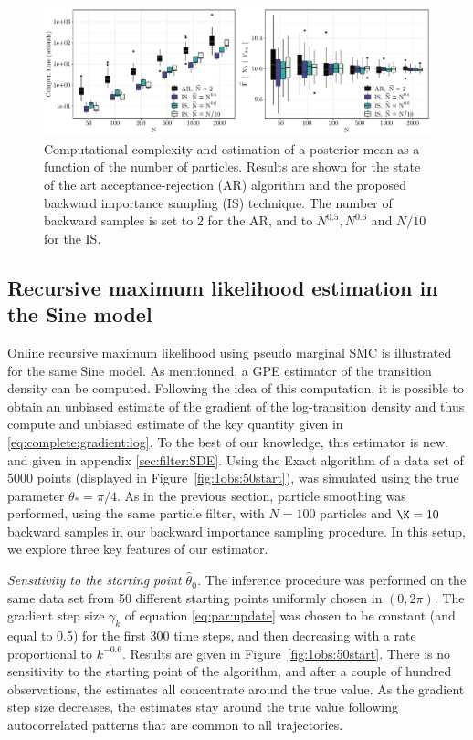 \documentclass[12pt]{article}
\newcommand{\parvec}{\theta}
\newcommand{\N}{N}
\begin{document}
\begin{figure}[h]
\begin{center}
\includegraphics[width = \textwidth]{Figure3.pdf}
\end{center}
\caption{Computational complexity and estimation of a posterior mean as a function of the number of particles. Results are shown for the state of the art acceptance-rejection (AR) algorithm and the proposed backward  importance sampling (IS) technique. The number of backward samples is set to 2 for the AR, and to $N^{0.5}, N^{0.6}$ and $N/10$ for the IS.}
\label{fig:sine:timeandbias:N:vary}
\end{figure}


\subsection{Recursive maximum likelihood estimation in the  Sine model}
\label{sec:simu:tangent:filter}
Online recursive maximum likelihood using pseudo marginal SMC is illustrated for the same Sine model.
As mentionned, a GPE estimator of the transition density can be computed. 
Following the idea of this computation, it is possible to obtain an unbiased estimate of the gradient of the log-transition density and thus compute and unbiased estimate of the key quantity given in \eqref{eq:complete:gradient:log}. 
To the best of our knowledge, this estimator is new, and given in appendix \ref{sec:filter:SDE}.
Using the Exact algorithm of \cite{beskos2006retrospective} a data set of 5000 points (displayed in Figure~\ref{fig:1obs:50start}), was simulated using the true parameter $\parvec_* = \pi/4$. 
As in the previous section, particle smoothing was performed, using  the same particle filter, with $\N = 100$ particles and $\K = 10$ backward samples in our backward importance sampling procedure. 
In this setup, we explore three key features of our estimator.

{\em Sensitivity to the starting point $\hat{\parvec}_0$.}
The inference procedure was performed on the same data set from 50 different starting points uniformly chosen in $(0,2\pi)$. 
The gradient step size $\gamma_k$ of equation \eqref{eq:par:update} was chosen to be constant (and equal to 0.5) for the first 300 time steps, and then decreasing with a rate proportional to $k^{-0.6}$. 
Results are given in Figure~\ref{fig:1obs:50start}. There is no sensitivity to the starting point of the algorithm, and after a couple of hundred observations, the estimates all concentrate around the true value. 
As the gradient step size decreases, the estimates stay around the true value following autocorrelated patterns that are common to all trajectories.
\end{document}
